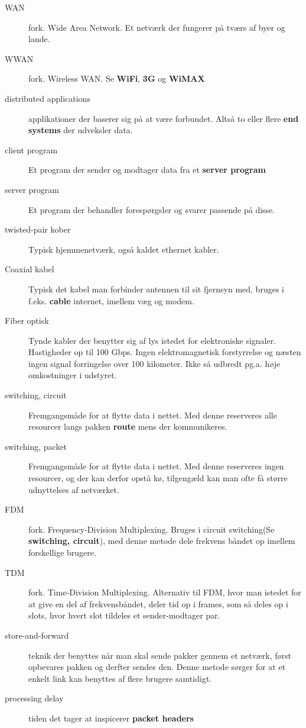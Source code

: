 \documentclass[10pt]{article}
\begin{document}
\begin{description}
\item[WAN] fork. Wide Area Network. Et netværk der fungerer på tværs af byer og
    lande.
\item[WWAN] fork. Wireless WAN. Se \textbf{WiFi}, \textbf{3G} og \textbf{WiMAX} 
\item[distributed applications] applikationer der baserer sig på at være
    forbundet. Altså to eller flere \textbf{end systems} der udveksler data.
\item[client program] Et program der sender og modtager data fra et
    \textbf{server program}
\item[server program] Et program der behandler forespørgsler og svarer passende
    på disse.
\item[twisted-pair kober] Typisk hjemmenetværk, også kaldet ethernet kabler.
\item[Coaxial kabel] Typisk det kabel man forbinder antennen til sit fjernsyn
    med, bruges i f.eks. \textbf{cable} internet, imellem væg og modem.
\item[Fiber optisk] Tynde kabler der benytter sig af lys istedet for
    elektroniske signaler. Hastigheder op til 100 Gbps. Ingen elektromagnetisk
    forstyrrelse og næsten ingen signal forringelse over 100 kilometer. Ikke så
    udbredt pg.a. høje omkostninger i udstyret.
\item[switching, circuit] Fremgangsmåde for at flytte data i nettet. Med denne
    reserveres alle resourcer langs pakken \textbf{route} mens der
    kommunikeres.
\item[switching, packet] Fremgangsmåde for at flytte data i nettet. Med denne
    reserveres ingen resourcer, og der kan derfor opstå kø, tilgengæld kan man
    ofte få større udnyttelses af netværket.
\item[FDM] fork. Frequency-Division Multiplexing. Bruges i circuit switching(Se
    \textbf{switching, circuit}), med denne metode dele frekvens båndet op
    imellem forskellige brugere.
\item[TDM] fork. Time-Division Multiplexing. Alternativ til FDM, hvor man
istedet for at give en del af frekvensbåndet, deler tid op i frames, som så
deles op i slots, hvor hvert slot tildeles et sender-modtager par.
\item[store-and-forward] teknik der benyttes når man skal sende pakker gennem
    et netværk, først opbevares pakken og derfter sendes den. Denne metode
    sørger for at et enkelt link kan benyttes af flere brugere samtidigt.
\item[processing delay] tiden det tager at inspicerer \textbf{packet headers}

\end{description}
\end{document}
